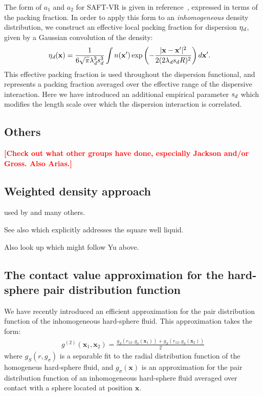 \documentclass[letterpaper,twocolumn,amsmath,amssymb,pre,aps,10pt]{revtex4-1}
\newcommand\xx{\mathbf{x}}
\newcommand\rr{\mathbf{x}}
\newcommand\fixme[1]{\textcolor{red}{\textbf{[#1]}}}
\begin{document}
The form of $a_1$ and $a_2$ for SAFT-VR is given in
reference~\cite{gil-villegas-1997-SAFT-VR}, expressed in terms
of the packing fraction.  In order to apply this form to an
\emph{inhomogeneous} density distribution, we construct an effective local
packing fraction for dispersion $\eta_\textit{d}$, given by a Gaussian
convolution of the density:
\begin{align}
  \etadisp(\xx) &= \frac{1}{6\sqrt{\pi} \lambdadisp^3\lscale^3}
  \int n(\xx')\exp\left({-\frac{|\xx-\xx'|^2}{2(2 \lambdadisp
      \lscale R)^2}}\right)d\xx'.
\end{align}
This effective packing fraction is used throughout the dispersion
functional, and represents a packing fraction averaged over the
effective range of the dispersive interaction.  Here we have
introduced an additional empirical parameter $s_d$ which modifies
the length scale over which the dispersion interaction is correlated.

\subsection{Others}

\fixme{Check out what other groups have done, especially Jackson
  and/or Gross.  Also Arias.}

\subsection{Weighted density approach}

\cite{peng2008meanfield} used by
\cite{sundararaman2013efficient} and many others.

See also \cite{yu2009novel} which explicitly addresses the square well
liquid.

Also look up \cite{shen2013hybrid} which might follow Yu above.

\subsection{The contact value approximation for the hard-sphere pair distribution function}

We have recently introduced an efficient approximation for the pair
distribution function of the inhomogeneous hard-sphere fluid.  This
approximation takes the form:
\begin{align}
  g^{(2)}(\rr_1,\rr_2) = \frac{g_S(r_{12}, g_\sigma(\rr_1)) +
    g_S(r_{12}, g_\sigma(\rr_2))}{2} \label{eq:g2-our-mean}
\end{align}
where $g_S(r,g_\sigma)$ is a separable fit to the radial distribution
function of the homogeneus hard-sphere fluid, and $g_\sigma(\rr)$ is
an approximation for the pair distribution function of an
inhomogeneous hard-sphere fluid averaged over contact with a sphere
located at position $\rr$.
\end{document}
